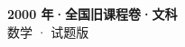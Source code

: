 \documentclass[zihao=-4, a4paper]{ctexart}
\begin{document}
\begin{center}
  {\Large\bfseries 2000 年·全国旧课程卷·文科}\\[4pt]
  {\large 数学 · 试题版}
\end{center}
\medskip
{}

\end{document}
